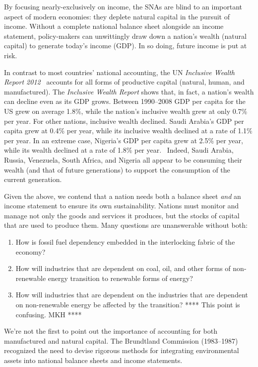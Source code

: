 By focusing nearly-exclusively on income, 
the SNAs are blind to an important aspect of modern economies:
they deplete natural capital in the pursuit of income.
Without a complete national balance sheet alongside an income statement, 
policy-makers can unwittingly draw down a nation’s wealth (natural capital) 
to generate today’s income (GDP). 
In so doing, future income is put at risk. 

In contrast to most countries' national accounting, 
the UN \emph{Inclusive Wealth Report 2012}~\cite{IWR2012} 
accounts for all forms of productive capital 
(natural, human, and manufactured). 
The \emph{Inclusive Wealth Report} shows that, in fact, 
a nation’s wealth can decline even as its GDP grows. 
Between 1990--2008 GDP per capita for the US grew on average 1.8\%, 
while the nation's inclusive wealth grew at only 0.7\% per year. 
For other nations, inclusive wealth declined. 
Saudi Arabia's GDP per capita grew at 0.4\% per year, 
while its inclusive wealth declined at a rate of 1.1\% per year. 
In an extreme case, Nigeria's GDP per capita grew at 2.5\% per year, 
while its wealth declined at a rate of 1.8\% per year.~\cite[p. 44]{IWR2012}  
Indeed, Saudi Arabia, Russia, Venezuela, South Africa, and Nigeria 
all appear to be consuming their wealth (and that of future generations) 
to support the consumption of the current generation.

Given the above, we contend that a nation needs both 
a balance sheet \emph{and} 
an income statement 
to ensure its own sustainability. 
Nations must monitor and manage not only the goods and services it produces, 
but the stocks of capital that are used to produce them. 
Many questions are unanswerable without both:

\begin{enumerate}
    \item{How is fossil fuel dependency embedded in the interlocking fabric of the economy?} 
    \item{How will industries that are dependent on coal, oil, 
 			and other forms of non-renewable energy transition 
			to renewable forms of energy?} 
    \item{How will industries that are dependent 
 			on the industries that are dependent on non-renewable energy 
			be affected by the transition? **** This point is confusing. MKH ****} 
\end{enumerate}

\vspace{10 mm}

We're not the first to point out the importance of accounting 
for both manufactured and natural capital. 
The Brundtland Commission (1983--1987) recognized the need 
to devise rigorous methods for integrating environmental assets 
into national balance sheets and income statements.


